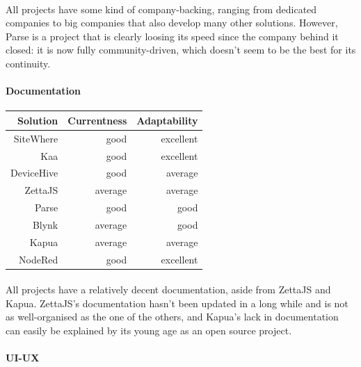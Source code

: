 \documentclass{article}
\begin{document}
\paragraph{} All projects have some kind of company-backing, ranging from dedicated companies to big companies that also develop many other solutions. However, Parse is a project that is clearly loosing its speed since the company behind it closed: it is now fully community-driven, which doesn't seem to be the best for its continuity.

\paragraph{Documentation}

\begin{center}
\begin{tabular}{r|r|r}
Solution & Currentness & Adaptability \\ \hline
SiteWhere & \cellcolor{blue!10}good & \cellcolor{green!25}excellent \\
Kaa & \cellcolor{blue!10}good & \cellcolor{green!25}excellent \\
DeviceHive & \cellcolor{blue!10}good & \cellcolor{yellow!25}average \\
ZettaJS & \cellcolor{yellow!25}average & \cellcolor{yellow!25}average \\
Parse & \cellcolor{blue!10}good & \cellcolor{blue!10}good \\
Blynk & \cellcolor{yellow!25}average & \cellcolor{blue!10}good \\
Kapua & \cellcolor{yellow!25}average & \cellcolor{yellow!25}average \\
NodeRed & \cellcolor{blue!10}good & \cellcolor{green!25}excellent \\
\end{tabular}
\end{center}

\paragraph{} All projects have a relatively decent documentation, aside from ZettaJS and Kapua. ZettaJS's documentation hasn't been updated in a long while and is not as well-organised as the one of the others, and Kapua's lack in documentation can easily be explained by its young age as an open source project.

\paragraph{UI-UX}
\end{document}
